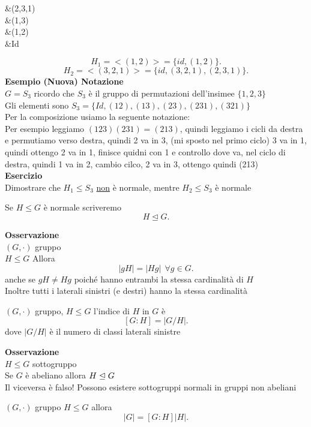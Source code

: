 \documentclass[12px]{article}
\begin{document}
\begin{aligend}
	&(2,3,1)\\
	&(1,3)\\
	&(1,2)\\
	&Id
\end{aligend}
\[
H_1 = <(1,2)> = \lbrace id, (1,2)\rbrace
.\] 
\[
H_2=<(3,2,1)> = \lbrace id, (3,2,1),(2,3,1)\rbrace
.\] 
\textbf{Esempio (Nuova) Notazione}\\
 $G=S_3$ ricordo che  $S_3$ è il gruppo di permutazioni dell'insimee $\lbrace 1,2,3\rbrace$\\
 Gli elementi sono $S_3 = \{Id, (12), (13),(23),(231),(321)\}$\\
 Per la composizione usiamo la seguente notazione:\\
 Per esempio leggiamo $(123)(231) = (213)$, quindi leggiamo i cicli da destra  e permutiamo verso destra, quindi 2 va in 3, (mi sposto nel primo ciclo) 3 va in 1, quindi ottengo 2 va in 1, finisce quidni con 1 e controllo dove va, nel ciclo di destra, quindi 1 va in 2, cambio cilco, 2 va in 3, ottengo quindi (213)\\
\textbf{Esercizio}\\
Dimostrare che $H_1\leq S_3$ \underline{non} è normale, mentre $H_2\leq S_3$ è normale
\begin{nota}
	Se $H\leq G$ è normale scriveremo
	 \[
	H \trianglelefteq G
	.\] 
\end{nota}
	\textbf{Osservazione}\\
	$(G,\cdot)$ gruppo\\
	$H\leq G$ Allora
	 \[
	|gH| = |Hg| \ \ \forall g\in G
	.\] 
	anche se $gH\neq Hg$ poiché hanno entrambi la stessa cardinalità di  $H$\\
	Inoltre tutti i laterali sinistri (e destri) hanno la stessa cardinalità\\
	 \begin{defi}
		 $(G,\cdot)$ gruppo, $H\leq G$ l'indice di  $H$ in $G$ è 
		  \[
			  [G:H] = |G/H|
		 .\] 
		 dove $|G/H|$ è il numero di classi laterali sinistre
	\end{defi}
	\textbf{Osservazione}\\
	$H\leq G$ sottogruppo\\
	Se  $G$ è abeliano allora  $H\trianglelefteq G$\\
	Il viceversa è falso! Possono esistere sottogruppi normali in gruppi non abeliani\\
	\begin{prop}
		$(G,\cdot)$ gruppo $H\leq G$ allora
		 \[
			 |G| = [G:H]|H|
		.\] 
	\end{prop}
\end{document}
